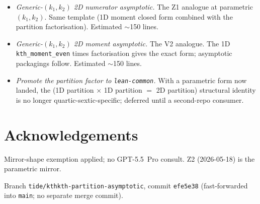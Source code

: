 \documentclass[11pt]{article}
\begin{document}
\begin{itemize}[leftmargin=2em]
\item \emph{Generic-$(k_1, k_2)$ 2D numerator asymptotic.} The Z1
analogue at parametric $(k_1, k_2)$. Same template (1D moment
closed form combined with the partition factorisation). Estimated
$\sim$150 lines.
\item \emph{Generic-$(k_1, k_2)$ 2D moment asymptotic.} The V2
analogue. The 1D \texttt{kth\_moment\_even} times factorisation
gives the exact form; asymptotic packagings follow. Estimated
$\sim$150 lines.
\item \emph{Promote the partition factor to \texttt{lean-common}.}
With a parametric form now landed, the (1D partition $\times$ 1D
partition $=$ 2D partition) structural identity is no longer
quartic-sextic-specific; deferred until a second-repo consumer.
\end{itemize}

\section*{Acknowledgements}

Mirror-shape exemption applied; no GPT-5.5~Pro consult. Z2
(2026-05-18) is the parametric mirror.

Branch \texttt{tide/kthkth-partition-asymptotic}, commit
\texttt{efe5e38} (fast-forwarded into \texttt{main}; no separate
merge commit).
\end{document}
